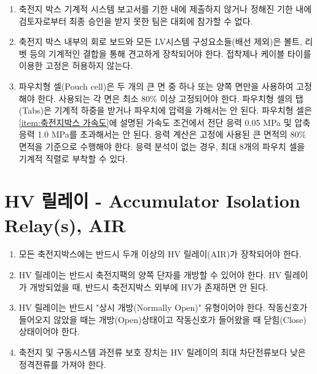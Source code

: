 \documentclass[final,a4paper,10pt]{report}
\begin{document}
\begin{enumerate}
  \item\label{rule:formula-technical.accumulator-container-mechanical.missed-approval-bars-entry} 축전지 박스 기계적 시스템 보고서를 기한 내에 제출하지 않거나 정해진 기한 내에 검토자로부터 최종 승인을 받지 못한 팀은 대회에 참가할 수 없다.
  \item\label{rule:formula-technical.accumulator-container-mechanical.mechanical-mounting-no-adhesive} 축전지 박스 내부의 회로 보드와 모든 LV시스템 구성요소들(배선 제외)은 볼트, 리벳 등의 기계적인 결합을 통해 견고하게 장착되어야 한다. 접착제나 케이블 타이를 이용한 고정은 허용하지 않는다.
  \item\label{rule:formula-technical.accumulator-container-mechanical.pouch-cell-mounting} {\color{blue}파우치형 셀(Pouch cell)은 두 개의 큰 면 중 하나 또는 양쪽 면만을 사용하여 고정해야 한다. 사용되는 각 면은 최소 80\% 이상 고정되어야 한다. 파우치형 셀의 탭(Tabs)은 기계적 하중을 받거나 파우치에 압력을 가해서는 안 된다. 파우치형 셀은 \ref{item:축전지박스 가속도}에 설명된 가속도 조건에서 전단 응력 0.05 MPa 및 압축 응력 1.0 MPa를 초과해서는 안 된다. 응력 계산은 고정에 사용된 큰 면적의 80\% 면적을 기준으로 수행해야 한다. 응력 분석이 없는 경우, 최대 8개의 파우치 셀을 기계적 직렬로 부착할 수 있다.}
\end{enumerate}

\section{HV 릴레이 - Accumulator Isolation Relay(s), AIR}\label{rule:formula-technical.accumulator-isolation-relay} \label{section:AIR}
\begin{enumerate}
  \item\label{rule:formula-technical.accumulator-isolation-relay.min-two-airs} 모든 축전지박스에는 반드시 두개 이상의 HV 릴레이(AIR)가 장착되어야 한다.
  \item\label{rule:formula-technical.accumulator-isolation-relay.both-terminal-isolation} HV 릴레이는 반드시 축전지팩의 양쪽 단자를 개방할 수 있어야 한다. HV 릴레이가 개방되었을 때, 반드시 축전지박스 외부에 HV가 존재하면 안 된다. \label{item:AIR 개방}
  \item\label{rule:formula-technical.accumulator-isolation-relay.normally-open-type} HV 릴레이는 반드시 "상시 개방(Normally Open)" 유형이어야 한다. 작동신호가 들어오지 않았을 때는 개방(Open)상태이고 작동신호가 들어왔을 때 닫힘(Close) 상태이어야 한다.
  \item\label{rule:formula-technical.accumulator-isolation-relay.below-air-breaking-current} 축전지 및 구동시스템 과전류 보호 장치는 HV 릴레이의 최대 차단전류보다 낮은 정격전류를 가져야 한다.
\end{enumerate}
\end{document}
